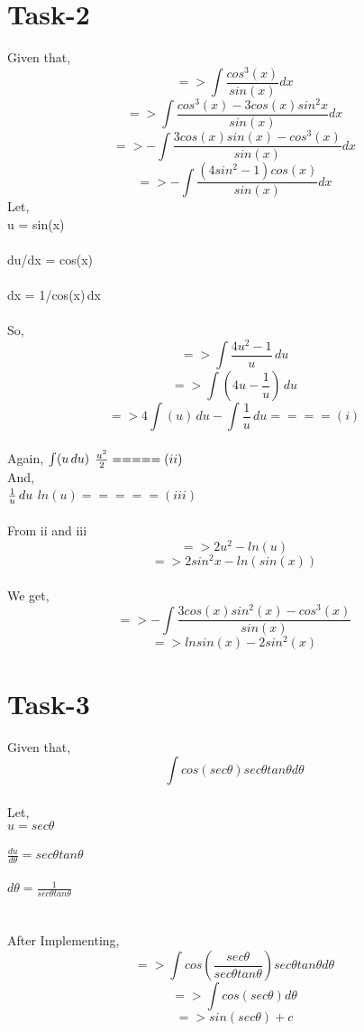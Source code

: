 \documentclass{article}
\begin{document}
\section{Task-2}
Given that,
\[=>\int{\frac{cos^3(x)}{sin(x)}dx} \]
\[=>\int \frac{cos^3 (x)-3cos(x)sin^2x}{sin(x)}dx\]
\[=>-\int \frac{3cos(x)sin(x)-cos^3(x)}{sin(x)}dx\]
\[=>-\int \frac{(4sin^2-1) cos(x)}{sin(x)}dx\]
Let,
\\u = sin(x)\\
\\ du/dx = cos(x)\\
\\ dx = {1/cos(x)}\,dx\\
\\So,
\[=>\int \frac{4u^2-1}{u}\,du\]
\[=>\int (4u-\frac{1}{u})\,du\]
\[=>4\int(u)\,du - \int \frac{1}{u}\,du ====(i)\]
\\Again,
$\int(u\,du)\\$
$ \frac{u^2}{2}=====(ii)\\$
\\And,
\\$\\ \frac{1}{u}\,du\\$
$ ln(u)=====(iii)$\\
\\From ii and iii
\[=>2u^2-ln(u)\] 
\[=>2sin^2x-ln(sin(x))\]
\\We get,
\[=>-\int \frac{3cos(x)sin^2(x)-cos^3(x)}{sin(x)}\]
\[=>lnsin(x)-2sin^2(x)\]

\newpage

\section{Task-3}
Given that,
\[\int cos(sec\theta)sec\theta tan\theta d\theta\]
\\Let,\\
$u = sec\theta$\\ \\
$\frac{du}{d\theta}= sec\theta tan\theta$\\  \\
$d\theta = \frac{1}{sec\theta tan\theta}$ \\ \\ \\
After Implementing,
\[=>\int cos(\frac{sec\theta}{sec\theta tan\theta}) sec\theta tan\theta d\theta\]
\[=>\int cos(sec\theta)d\theta\]
\[=>sin(sec\theta)+c\]
\end{document}
